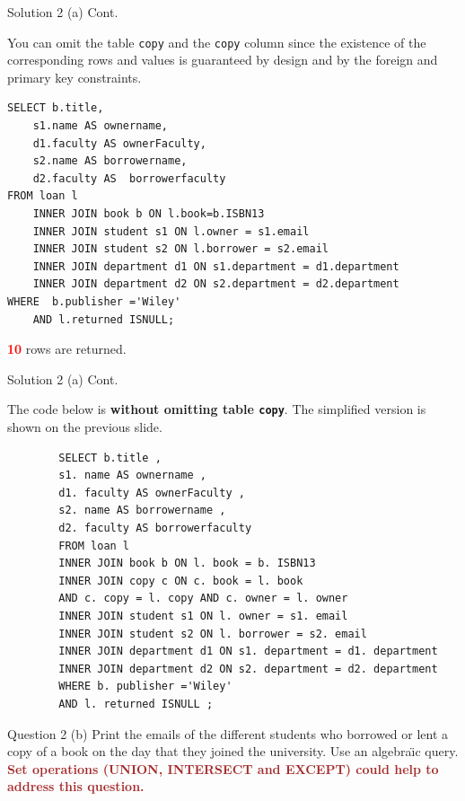\begin{frame}[fragile]{Solution 2 (a) Cont.}

You can omit the table \texttt{copy} and the \texttt{copy} column since the existence of the corresponding rows and values is guaranteed by design and by the foreign and primary key constraints.

\begin{lstlisting}
SELECT b.title, 
	s1.name AS ownername, 
	d1.faculty AS ownerFaculty, 
	s2.name AS borrowername, 
	d2.faculty AS  borrowerfaculty
FROM loan l 
	INNER JOIN book b ON l.book=b.ISBN13
	INNER JOIN student s1 ON l.owner = s1.email
	INNER JOIN student s2 ON l.borrower = s2.email
	INNER JOIN department d1 ON s1.department = d1.department
	INNER JOIN department d2 ON s2.department = d2.department
WHERE  b.publisher ='Wiley'
	AND l.returned ISNULL;
\end{lstlisting} 

\textcolor{red}{\textbf{10}} rows are returned.
\end{frame}

\begin{frame}[fragile]{Solution 2 (a) Cont.}
	
	The code below is \textbf{without omitting table \texttt{copy}}. The simplified version is shown on the previous slide.	
	
	\begin{lstlisting}
		SELECT b.title ,
		s1. name AS ownername ,
		d1. faculty AS ownerFaculty ,
		s2. name AS borrowername ,
		d2. faculty AS borrowerfaculty
		FROM loan l
		INNER JOIN book b ON l. book = b. ISBN13
		INNER JOIN copy c ON c. book = l. book
		AND c. copy = l. copy AND c. owner = l. owner
		INNER JOIN student s1 ON l. owner = s1. email
		INNER JOIN student s2 ON l. borrower = s2. email
		INNER JOIN department d1 ON s1. department = d1. department
		INNER JOIN department d2 ON s2. department = d2. department
		WHERE b. publisher ='Wiley'
		AND l. returned ISNULL ;
	\end{lstlisting} 
	
\end{frame}
	
\begin{frame}[fragile]{Question 2 (b)}
Print the emails of the different students who borrowed or lent a copy of a book on the day that they joined the university. Use an algebra\"{\i}c query.\\
\vspace{10pt}
\textcolor{brown}{\textbf{Set operations (UNION, INTERSECT and EXCEPT) could help to address this question.}}
\end{frame}

